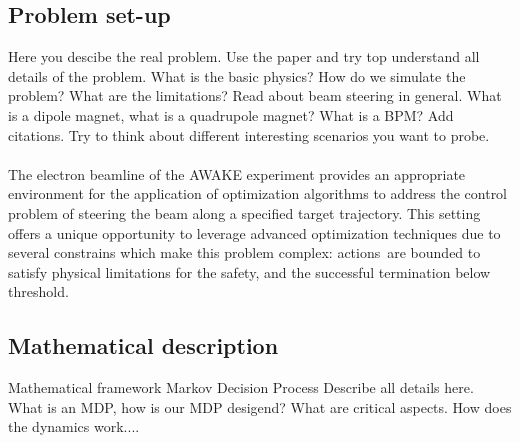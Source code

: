 \documentclass[journal,article,submit,pdftex,moreauthors]{Definitions/mdpi}
\begin{document}
\subsection{Problem set-up}
\noindent Here you descibe  the real problem. Use the paper \cite{KainVerena2023} and try top understand all details of the problem. What is the basic physics? How do we simulate the problem? What are the limitations? Read about beam steering in general. What is a dipole magnet, what is a quadrupole magnet? What is a BPM? Add citations. Try to think about different interesting scenarios you want to probe.\\\\
The electron beamline of the AWAKE experiment provides an appropriate environment for the application of optimization algorithms to address the control problem of steering the beam along a specified target trajectory. This setting offers a unique opportunity to leverage advanced optimization techniques due to several constrains which make this problem complex: actions are bounded to satisfy physical limitations for the safety, and the successful termination below threshold. 
\subsection{Mathematical description}
Mathematical framework Markov Decision Process Describe all details here. What is an MDP, how is our MDP desigend? What are critical aspects.
How does the dynamics work....
\end{document}
